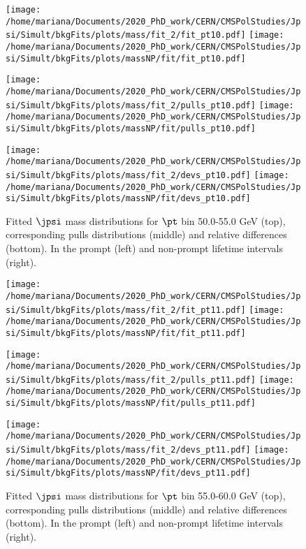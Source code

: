 \pagebreak

\begin{figure}[h!]
\centering
\texttt{[image: /home/mariana/Documents/2020\_PhD\_work/CERN/CMSPolStudies/Jpsi/Simult/bkgFits/plots/mass/fit\_2/fit\_pt10.pdf]}
\texttt{[image: /home/mariana/Documents/2020\_PhD\_work/CERN/CMSPolStudies/Jpsi/Simult/bkgFits/plots/massNP/fit/fit\_pt10.pdf]}

\texttt{[image: /home/mariana/Documents/2020\_PhD\_work/CERN/CMSPolStudies/Jpsi/Simult/bkgFits/plots/mass/fit\_2/pulls\_pt10.pdf]}
\texttt{[image: /home/mariana/Documents/2020\_PhD\_work/CERN/CMSPolStudies/Jpsi/Simult/bkgFits/plots/massNP/fit/pulls\_pt10.pdf]}

\texttt{[image: /home/mariana/Documents/2020\_PhD\_work/CERN/CMSPolStudies/Jpsi/Simult/bkgFits/plots/mass/fit\_2/devs\_pt10.pdf]}
\texttt{[image: /home/mariana/Documents/2020\_PhD\_work/CERN/CMSPolStudies/Jpsi/Simult/bkgFits/plots/massNP/fit/devs\_pt10.pdf]}
\caption{Fitted $\jpsi$ mass distributions for $\pt$ bin 50.0-55.0 GeV (top), corresponding pulls distributions (middle) and relative differences (bottom). In the prompt (left) and non-prompt lifetime intervals (right).}\label{f:m_fit_10}
\end{figure}

\pagebreak

\begin{figure}[h!]
\centering
\texttt{[image: /home/mariana/Documents/2020\_PhD\_work/CERN/CMSPolStudies/Jpsi/Simult/bkgFits/plots/mass/fit\_2/fit\_pt11.pdf]}
\texttt{[image: /home/mariana/Documents/2020\_PhD\_work/CERN/CMSPolStudies/Jpsi/Simult/bkgFits/plots/massNP/fit/fit\_pt11.pdf]}

\texttt{[image: /home/mariana/Documents/2020\_PhD\_work/CERN/CMSPolStudies/Jpsi/Simult/bkgFits/plots/mass/fit\_2/pulls\_pt11.pdf]}
\texttt{[image: /home/mariana/Documents/2020\_PhD\_work/CERN/CMSPolStudies/Jpsi/Simult/bkgFits/plots/massNP/fit/pulls\_pt11.pdf]}

\texttt{[image: /home/mariana/Documents/2020\_PhD\_work/CERN/CMSPolStudies/Jpsi/Simult/bkgFits/plots/mass/fit\_2/devs\_pt11.pdf]}
\texttt{[image: /home/mariana/Documents/2020\_PhD\_work/CERN/CMSPolStudies/Jpsi/Simult/bkgFits/plots/massNP/fit/devs\_pt11.pdf]}
\caption{Fitted $\jpsi$ mass distributions for $\pt$ bin 55.0-60.0 GeV (top), corresponding pulls distributions (middle) and relative differences (bottom). In the prompt (left) and non-prompt lifetime intervals (right).}\label{f:m_fit_11}
\end{figure}

